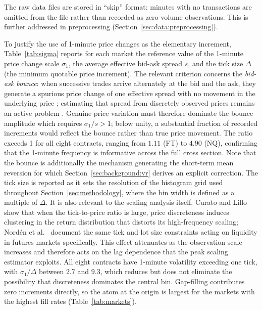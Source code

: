 \documentclass[conference]{IEEEtran}
\begin{document}
The raw data files are stored in ``skip'' format: minutes with no transactions are
omitted from the file rather than recorded as zero-volume observations. This
is further addressed in preprocessing (Section~\ref{sec:data:preprocessing}).

To justify the use of 1-minute price changes as the elementary increment,
Table~\ref{tab:sigma} reports for each market the reference value of the
1-minute price change scale $\sigma_1$, the average effective bid-ask spread $s$,
and the tick size $\Delta$ (the minimum quotable price increment).
The relevant criterion concerns the \textit{bid-ask bounce}: when successive
trades arrive alternately at the bid and the ask, they generate a spurious
price change of one effective spread with no movement in the underlying price
\cite{Roll1984}; estimating that spread from discretely observed prices
remains an active problem \cite{Ardia2024,Shaik2026}. Genuine price variation
must therefore dominate the bounce
amplitude which requires $\sigma_1/s > 1$; below unity, a substantial
fraction of recorded increments would reflect the bounce rather than true
price movement. The ratio exceeds 1 for all eight contracts, ranging from
$1.11$ (FT) to $4.90$ (NQ), confirming that the 1-minute frequency is
informative across the full cross section.
Note that the bounce is additionally the mechanism
generating the short-term mean reversion for which
Section~\ref{sec:background:vr} derives an explicit correction.
The tick size is reported as it sets the resolution of
the histogram grid used throughout Section~\ref{sec:methodology}, where the
bin width is defined as a multiple of $\Delta$. It is also relevant to the
scaling analysis itself. Curato and Lillo \cite{CuratoLillo2015} show that
when the tick-to-price ratio is large, price discreteness induces clustering
in the return distribution that distorts its high-frequency scaling;
Nord{\'e}n et al.\ \cite{Norden2026} document the same tick and lot size
constraints acting on liquidity in futures markets specifically. This
effect attenuates as the observation scale increases and therefore acts
on the lag dependence that the peak scaling estimator exploits. All eight
contracts have 1-minute volatility exceeding one tick, with $\sigma_1/\Delta$
between $2.7$ and $9.3$, which reduces but does not eliminate the possibility
that discreteness dominates the central bin. Gap-filling contributes zero
increments directly, so the atom at the origin is largest for the markets with
the highest fill rates (Table~\ref{tab:markets}).
\end{document}
